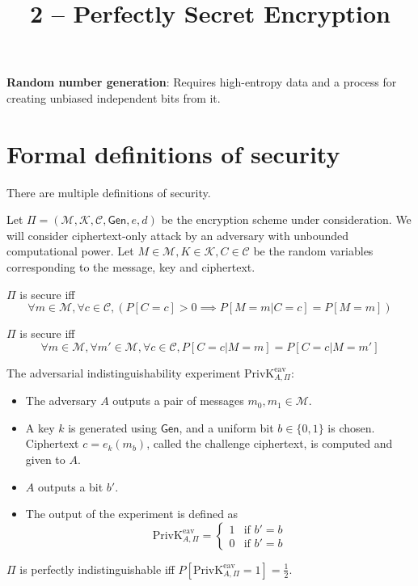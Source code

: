 

\title{2 -- Perfectly Secret Encryption}

\newcommand*{\StdEncScheme}[1]{(\mathcal{M}, \mathcal{K}, \mathcal{C}, \textsf{Gen}, e, d)}



\initAfterBeginDocument{}

\textbf{Random number generation}: Requires high-entropy data and a process
for creating unbiased independent bits from it.

\section{Formal definitions of security}

There are multiple definitions of security.

Let $\Pi = \StdEncScheme{}$
be the encryption scheme under consideration.
We will consider ciphertext-only attack by an adversary with unbounded computational power.
Let $M \in \mathcal{M}, K \in \mathcal{K}, C \in \mathcal{C}$
be the random variables corresponding to the message, key and ciphertext.

\begin{definition}
$\Pi$ is secure iff
\[ \forall m \in \mathcal{M}, \forall c \in \mathcal{C}, (P[C=c] > 0
\implies P[M=m|C=c] = P[M=m]) \]
\end{definition}

\begin{definition}
$\Pi$ is secure iff
\[ \forall m \in \mathcal{M}, \forall m' \in \mathcal{M}, \forall c \in \mathcal{C},
P[C=c|M=m] = P[C=c|M=m'] \]
\end{definition}

\begin{definition}
The adversarial indistinguishability experiment $\textrm{PrivK}^{\textrm{eav}}_{A,\Pi}$:
\begin{itemize}
\item The adversary $A$ outputs a pair of messages $m_0, m_1 \in \mathcal{M}$.
\item A key $k$ is generated using $\textsf{Gen}$, and a uniform bit $b \in \{0, 1\}$ is chosen.
Ciphertext $c = e_k(m_b)$, called the challenge ciphertext, is computed and given to $A$.
\item $A$ outputs a bit $b'$.
\item The output of the experiment is defined as
\[ \textrm{PrivK}^{\mathrm{eav}}_{A, \Pi}
= \begin{cases}1 & \textrm{if } b' = b \\ 0 & \textrm{if } b' = b\end{cases} \]
\end{itemize}
$\Pi$ is perfectly indistinguishable iff $P[\textrm{PrivK}^{\textrm{eav}}_{A,\Pi} = 1] = \frac{1}{2}$.
\end{definition}

